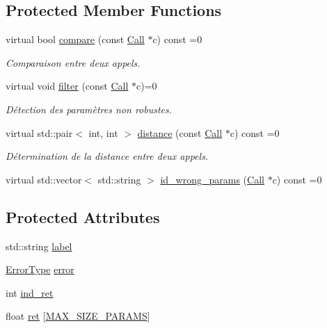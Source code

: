 \subsection*{Protected Member Functions}
\begin{DoxyCompactItemize}
\item 
virtual bool \hyperlink{class_call_a48f59d92851fd5802ace768dc9470564}{compare} (const \hyperlink{class_call}{Call} $\ast$c) const  =0
\begin{DoxyCompactList}\small\item\em Comparaison entre deux appels. \end{DoxyCompactList}\item 
virtual void \hyperlink{class_call_acd4b5ce39b8ab5850321594dea288940}{filter} (const \hyperlink{class_call}{Call} $\ast$c)=0
\begin{DoxyCompactList}\small\item\em Détection des paramètres non robustes. \end{DoxyCompactList}\item 
virtual std\+::pair$<$ int, int $>$ \hyperlink{class_call_a79e000ddc3d6c863e28d601e417b096f}{distance} (const \hyperlink{class_call}{Call} $\ast$c) const  =0
\begin{DoxyCompactList}\small\item\em Détermination de la distance entre deux appels. \end{DoxyCompactList}\item 
virtual std\+::vector$<$ std\+::string $>$ \hyperlink{class_call_a4ca5c037197ed0391119ac7be3eb14c6}{id\+\_\+wrong\+\_\+params} (\hyperlink{class_call}{Call} $\ast$c) const  =0
\end{DoxyCompactItemize}
\subsection*{Protected Attributes}
\begin{DoxyCompactItemize}
\item 
std\+::string \hyperlink{class_call_ad6b8343d530798fdb48407b3f2489ae7}{label}
\item 
\hyperlink{class_call_ade833a08ce215aaa4121102f3448c898}{Error\+Type} \hyperlink{class_call_a206f6150a8038fda48c17c2c7421aed1}{error}
\item 
int \hyperlink{class_call_ac61426df38580506f015d44c687c2ee8}{ind\+\_\+ret}
\item 
float \hyperlink{class_call_a634f1033a7d282e03578a3d0fd2823f8}{ret} \mbox{[}\hyperlink{_call_8h_a92280872d50a2c64ffe1acbc6c88dfff}{M\+A\+X\+\_\+\+S\+I\+Z\+E\+\_\+\+P\+A\+R\+A\+MS}\mbox{]}
\end{DoxyCompactItemize}
